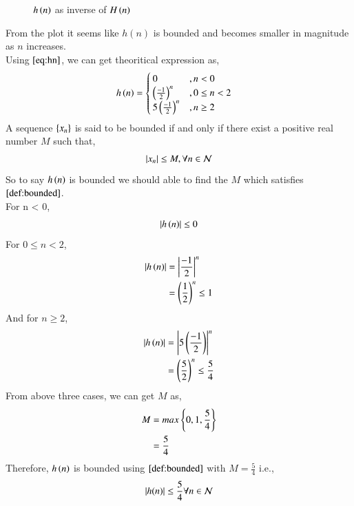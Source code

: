 \documentclass[journal,12pt,twocolumn]{IEEEtran}
\renewcommand\thesection{\arabic{section}}
\begin{document}
\begin{enumerate}[label=\thesection.\arabic*]
\begin{figure}[ht!]
      \caption{$h\left(n\right)$ as inverse of $H\left(n\right)$}     
      \label{hn}
     \end{figure}
     From the plot it seems like $h(n)$ is bounded and becomes smaller in magnitude as $n$ increases.\\
    Using $\eqref{eq:hn}$, we can get theoritical expression as, 
     \begin{align}
       h\left(n\right) &= \begin{cases}
                        0 &, n < 0\\
                        \left(\frac{-1}{2}\right)^n &, 0\leq n<2\\
                        5\left(\frac{-1}{2}\right)^n &, n \geq 2
                     \end{cases}\label{eq:hn_theo}
     \end{align}
    A sequence $\left\{x_n\right\}$ is said to be bounded if and only if there exist a positive real number $M$ such that,
         \begin{align}
           \left\vert x_n\right\vert \leq M , \forall n \in \mathcal{N}\label{def:bounded}
         \end{align}      
    So to say $h\left(n\right)$ is bounded we should able to find the $M$ which satisfies $\eqref{def:bounded}$.\\
    For n < 0, 
       \begin{align}
    \left\vert h\left(n\right)\right\vert \leq 0 
       \end{align}
    For $0 \leq n <2$,
       \begin{align}
        \left\vert h\left(n\right)\right\vert &= \left\vert\frac{-1}{2}\right\vert^{n}\\
                        &= \left(\frac{1}{2}\right)^{n} \leq 1
       \end{align}
    And for $n \geq 2$,
       \begin{align}
        \left\vert h\left(n\right)\right\vert &= \left\vert5\left(\frac{-1}{2}\right)\right\vert^{n}\\
                        &= \left(\frac{5}{2}\right)^{n} \leq \frac{5}{4}
       \end{align}
    From above three cases, we can get $M$ as,
      \begin{align}
        M &= max\left\{0,1,\frac{5}{4}\right\} \\
          &= \frac{5}{4}
      \end{align}
    Therefore, $h\left(n\right)$ is bounded using $\eqref{def:bounded}$ with $M = \frac{5}{4}$ i.e.,
    \begin{align} 
      \left\vert h(n)\right\vert \leq \frac{5}{4}  \forall n \in \mathcal{N}
    \end{align}    

\end{enumerate}
\end{document}
